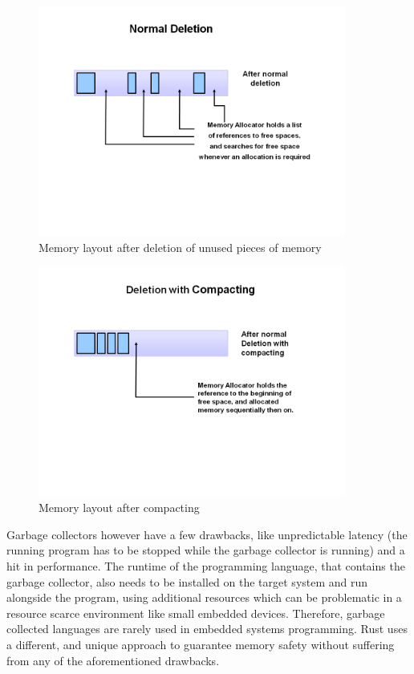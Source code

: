 \begin{figure}[htb]
    \centering
    \includegraphics[width=0.9\textwidth]{figures/fundamentals_garbage_collector_deletion.PNG}
    \caption[Illustration: Garbage Collector deleting marked memory \cite{java_garbage_collector}]{Memory layout after deletion of unused pieces of memory}
    \label{fig:gc_delete}
\end{figure}

\begin{figure}[H]
    \centering
    \includegraphics[width=0.9\textwidth]{figures/fundamentals_garbage_collector_compacting.PNG}
    \caption[Illustration: Garbage Collector compacting memory \cite{java_garbage_collector}]{Memory layout after compacting}
    \label{fig:gc_compact}
\end{figure}

Garbage collectors however have a few drawbacks, like unpredictable latency (the running program has to be stopped while the garbage collector is running) and a hit in performance.
The runtime of the programming language, that contains the garbage collector, also needs to be installed on the target system and run alongside the program, using additional
resources which can be problematic in a resource scarce environment like small embedded devices.
Therefore, garbage collected languages are rarely used in embedded systems programming.
Rust uses a different, and unique approach to guarantee memory safety without suffering from any of the aforementioned drawbacks.

